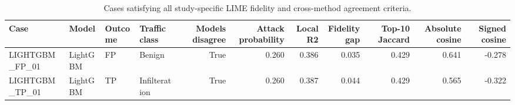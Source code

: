 \begin{table}
\caption{Cases satisfying all study-specific LIME fidelity and cross-method agreement criteria.}
\label{tab:lime_qualified_cases}
\begin{tabular}{llllrrrrrrr}
\toprule
Case & Model & Outcome & Traffic class & Models disagree & Attack probability & Local R2 & Fidelity gap & Top-10 Jaccard & Absolute cosine & Signed cosine \\
\midrule
LIGHTGBM_FP_01 & LightGBM & FP & Benign & True & 0.260 & 0.386 & 0.035 & 0.429 & 0.641 & -0.278 \\
LIGHTGBM_TP_01 & LightGBM & TP & Infilteration & True & 0.260 & 0.387 & 0.044 & 0.429 & 0.565 & -0.322 \\
\bottomrule
\end{tabular}
\end{table}
